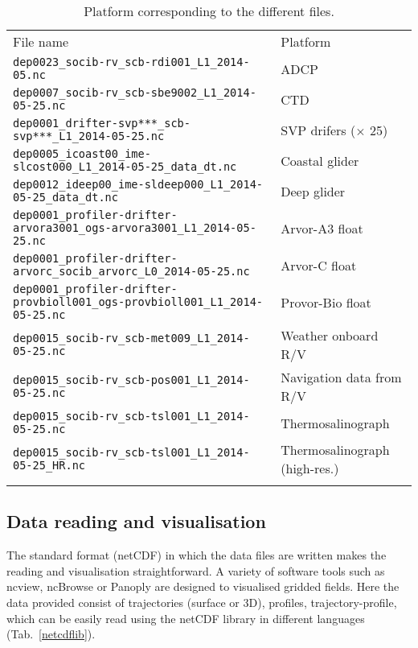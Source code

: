 \documentclass[essd,manuscript]{copernicus}
\begin{document}
\begin{table*}[h]
\caption{Platform corresponding to the different files.\label{tab:filenales}}
\begin{tabular}{ll}
\tophline
File name				& Platform 															\\
\middlehline
\verb#dep0023_socib-rv_scb-rdi001_L1_2014-05.nc#					& ADCP								\\
\verb#dep0007_socib-rv_scb-sbe9002_L1_2014-05-25.nc#				& CTD 								\\
\verb#dep0001_drifter-svp***_scb-svp***_L1_2014-05-25.nc#			& SVP drifers ($\times$ 25)		\\
\verb#dep0005_icoast00_ime-slcost000_L1_2014-05-25_data_dt.nc#	& Coastal glider 					\\
\verb#dep0012_ideep00_ime-sldeep000_L1_2014-05-25_data_dt.nc#		& Deep glider 	 					\\
\verb#dep0001_profiler-drifter-arvora3001_ogs-arvora3001_L1_2014-05-25.nc#	& Arvor-A3 float		\\
\verb#dep0001_profiler-drifter-arvorc_socib_arvorc_L0_2014-05-25.nc# 			& Arvor-C float			\\
\verb#dep0001_profiler-drifter-provbioll001_ogs-provbioll001_L1_2014-05-25.nc# & Provor-Bio float	\\
\verb#dep0015_socib-rv_scb-met009_L1_2014-05-25.nc#				& Weather onboard  R/V 				\\
\verb#dep0015_socib-rv_scb-pos001_L1_2014-05-25.nc#				& Navigation data from R/V 		\\
\verb#dep0015_socib-rv_scb-tsl001_L1_2014-05-25.nc#				& Thermosalinograph					\\
\verb#dep0015_socib-rv_scb-tsl001_L1_2014-05-25_HR.nc#			& Thermosalinograph (high-res.)	\\
\bottomhline
\end{tabular}
\end{table*}

\subsection{Data reading and visualisation}

The standard format (netCDF) in which the data files are written makes the reading and visualisation straightforward. A variety of software tools such as ncview, ncBrowse or Panoply are designed to visualised gridded fields. Here the data provided consist of trajectories (surface or 3D), profiles, trajectory-profile, which can be easily read using the netCDF library in different languages (Tab.~\ref{netcdflib}).
\end{document}
